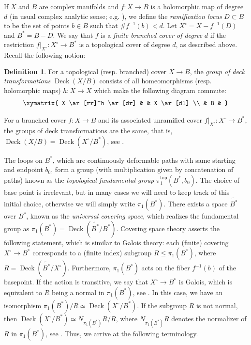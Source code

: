 \documentclass[10pt]{amsart}
\theoremstyle{definition}
\newtheorem{definition}[theorem]{Definition}
\begin{document}
If $X$ and $B$ are complex manifolds and $f \colon X \to B$ is a holomorphic map of degree $d$ (in usual complex analytic sense; e.g. \cite[Def. 1.6]{MR1185074}), we define the {\em ramification locus} $D \subset B$ to be the set of points $b \in B$ such that $\# f^{-1}(b) < d$. 
Let $X^\circ = X-f^{-1}(D)$ and $B^* = B-D$. We say that $f$ is a {\em finite branched cover of degree} $d$ if the restriction $f|_{X^\circ} \colon X^\circ \rightarrow B^*$ is a topological cover of degree $d$, as described above. 
 Recall the following notion:
\begin{definition}
For a topological (resp. branched) cover $X \rightarrow B$, the {\em group of deck transformations} $\operatorname{Deck}(X/B)$ consists of all homeomorphisms (resp. holomorphic maps) $h\colon X \rightarrow X$ which make the following diagram commute:
\[
\xymatrix{ X \ar[rr]^h \ar[dr] &  &  X \ar[dl] \\
& B & }
\]
\end{definition}
For a branched cover $f \colon X\rightarrow B$ and its associated unramified cover 
$f|_{X^\circ} \colon X^\circ \rightarrow B^*$, the groups of deck transformations are the same, that is,  
$\operatorname{Deck}(X/B) = \operatorname{Deck}(X^\circ/B^*)$, see 
\cite[Thm. 8.5]{MR1185074}.


The loops on $B^*$, which are continuously deformable paths with same starting and endpoint $b_0$, form a group (with multiplication given by concatenation of paths) known as the {\em topological fundamental group} $\pi_1^{\operatorname{top}}(B^*,b_0)$.  The choice of base point is irrelevant, but in many cases we will need to keep track of this initial choice, otherwise we will simply write $\pi_1(B^*)$. 
There exists a space $\widetilde{B^*}$ over $B^*$, known as the {\em universal covering space}, which realizes the fundamental group as $\pi_1(B^*) = \operatorname{Deck}(\widetilde{B^*}/B^*)$.
Covering space theory asserts the following statement, which is similar to Galois theory: each (finite) covering $X^\circ \to B^*$ corresponds to a (finite index) subgroup $R \leq \pi_1(B^*)$, where $R = \operatorname{Deck}(\widetilde{B^*}/X^\circ)$. Furthermore, $\pi_1(B^*)$ acts on the fiber $f^{-1}(b)$ of the basepoint. If the action is transitive, we say that $X^\circ \to B^*$ is Galois, which is equivalent to $R$ being a normal in $\pi_1(B^*)$, see \cite[Ch. 2, Prop. 2.2.7]{MR2548205}. In this case, we have an isomorphism $\pi_1(B^*)/R \simeq \operatorname{Deck}(X^\circ/B^*)$. If the subgroup $R$ is not normal, then $\operatorname{Deck}(X^\circ/B^*) \simeq  N_{\pi_1(B^*)}R/R$, where $N_{\pi_1(B^*)}R$ denotes the normalizer of $R$ in $\pi_1(B^*)$, see \cite[Exer. 13.12, P.184]{MR1343250}. Thus, we arrive at the following terminology.
\end{document}
